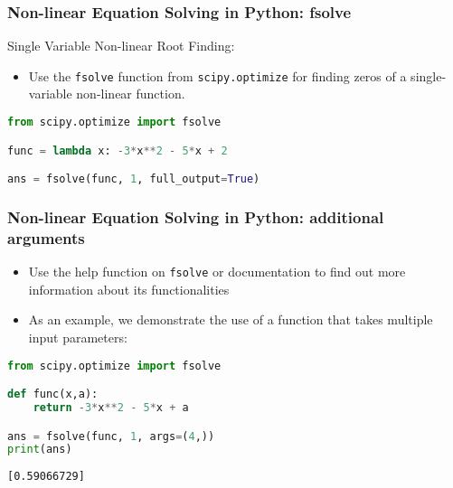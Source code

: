\begin{frame}[fragile]
  \frametitle{Non-linear Equation Solving in Python: fsolve}

  Single Variable Non-linear Root Finding:
  \begin{itemize}
      \item Use the \lstinline|fsolve| function from \lstinline|scipy.optimize| for finding zeros of a single-variable non-linear function.
  \end{itemize}

  \begin{lstlisting}[language=Python]
from scipy.optimize import fsolve

func = lambda x: -3*x**2 - 5*x + 2

ans = fsolve(func, 1, full_output=True)
  \end{lstlisting}
  
\end{frame}

\begin{frame}[fragile]
  \frametitle{Non-linear Equation Solving in Python: additional arguments}

  \begin{itemize}
      \item Use the help function on \lstinline|fsolve| or documentation to find out more information about its functionalities
      \item As an example, we demonstrate the use of a function that takes multiple input parameters:
  \end{itemize}

  \begin{lstlisting}[language=Python]
from scipy.optimize import fsolve

def func(x,a):
    return -3*x**2 - 5*x + a

ans = fsolve(func, 1, args=(4,))
print(ans)
  \end{lstlisting}
  \begin{lstlisting}[style=PyOutput]
[0.59066729]
  \end{lstlisting}
\end{frame}

